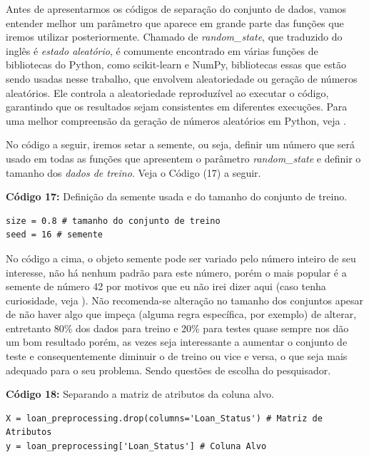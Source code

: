 \documentclass[a4paper,12pt]{article} %
\begin{document}
Antes de apresentarmos os códigos de separação do conjunto de dados, vamos entender melhor um parâmetro que aparece em grande parte das funções que iremos utilizar posteriormente. Chamado de \textit{random\_state}, que traduzido do inglês é \textit{estado aleatório}, é comumente encontrado em várias funções de bibliotecas do Python, como scikit-learn e NumPy, bibliotecas essas que estão sendo usadas nesse trabalho, que envolvem aleatoriedade ou geração de números aleatórios. Ele controla a aleatoriedade reproduzível ao executar o código, garantindo que os resultados sejam consistentes em diferentes execuções. Para uma melhor compreensão da geração de números aleatórios em Python, veja \cite{python-random}.

No código a seguir, iremos setar a semente, ou seja, definir um número  que será usado em todas as funções que apresentem o parâmetro \textit{random\_state} e definir o tamanho dos \textit{dados de treino}. Veja o Código (17) a seguir.
\begin{center}
\textbf{Código 17:} Definição da semente usada e do tamanho do conjunto de treino.
\begin{verbatim}
size = 0.8 # tamanho do conjunto de treino
seed = 16 # semente
\end{verbatim}
\end{center}

No código a cima, o objeto semente pode ser variado pelo número inteiro de seu interesse, não há nenhum padrão para este número, porém o mais popular é a semente de número 42 por  motivos que eu não irei dizer aqui (caso tenha curiosidade, veja \cite{random42}). Não recomenda-se alteração no tamanho dos conjuntos apesar de não haver algo que impeça (alguma regra específica, por exemplo) de alterar, entretanto 80\% dos dados para treino e 20\% para testes quase sempre nos dão um bom resultado porém, as vezes seja interessante a aumentar o conjunto de teste e consequentemente diminuir o de treino ou vice e versa, o que seja mais adequado para o seu problema. Sendo questões de escolha do pesquisador.

\begin{center}
\textbf{Código 18:} Separando a matriz de atributos da coluna alvo.
\begin{verbatim}
X = loan_preprocessing.drop(columns='Loan_Status') # Matriz de Atributos
y = loan_preprocessing['Loan_Status'] # Coluna Alvo
\end{verbatim}
\end{center}
\end{document}
